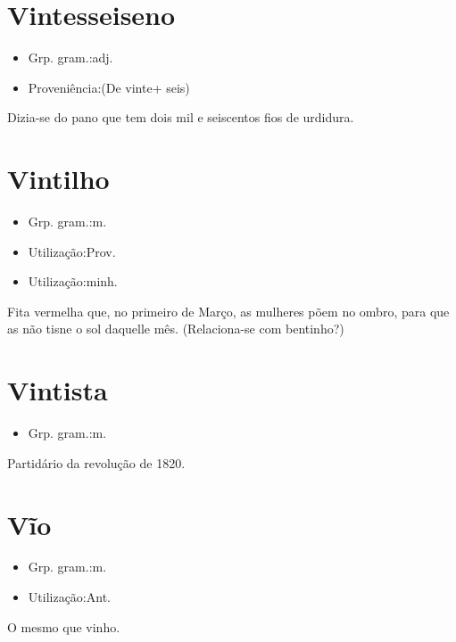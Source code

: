 \documentclass{article}
\begin{document}
\section{Vintesseiseno}
\begin{itemize}
\item {Grp. gram.:adj.}
\end{itemize}
\begin{itemize}
\item {Proveniência:(De \textunderscore vinte\textunderscore  + \textunderscore seis\textunderscore )}
\end{itemize}
Dizia-se do pano que tem dois mil e seiscentos fios de urdidura.
\section{Vintilho}
\begin{itemize}
\item {Grp. gram.:m.}
\end{itemize}
\begin{itemize}
\item {Utilização:Prov.}
\end{itemize}
\begin{itemize}
\item {Utilização:minh.}
\end{itemize}
Fita vermelha que, no primeiro de Março, as mulheres põem no ombro, para que as não tisne o sol daquelle mês.
(Relaciona-se com \textunderscore bentinho\textunderscore ?)
\section{Vintista}
\begin{itemize}
\item {Grp. gram.:m.}
\end{itemize}
Partidário da revolução de 1820.
\section{Vĩo}
\begin{itemize}
\item {Grp. gram.:m.}
\end{itemize}
\begin{itemize}
\item {Utilização:Ant.}
\end{itemize}
O mesmo que \textunderscore vinho\textunderscore .
\end{document}
